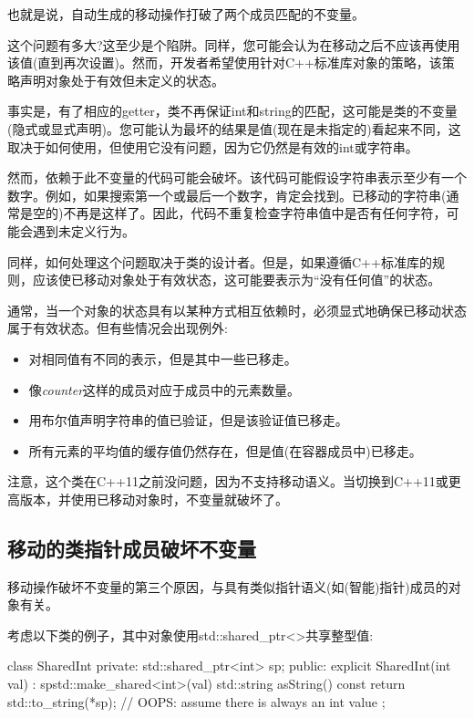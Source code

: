 也就是说，自动生成的移动操作打破了两个成员匹配的不变量。

这个问题有多大?这至少是个陷阱。同样，您可能会认为在移动之后不应该再使用该值(直到再次设置)。然而，开发者希望使用针对C++标准库对象的策略，该策略声明对象处于有效但未定义的状态。

事实是，有了相应的getter，类不再保证int和string的匹配，这可能是类的不变量(隐式或显式声明)。您可能认为最坏的结果是值(现在是未指定的)看起来不同，这取决于如何使用，但使用它没有问题，因为它仍然是有效的int或字符串。

然而，依赖于此不变量的代码可能会破坏。该代码可能假设字符串表示至少有一个数字。例如，如果搜索第一个或最后一个数字，肯定会找到。已移动的字符串(通常是空的)不再是这样了。因此，代码不重复检查字符串值中是否有任何字符，可能会遇到未定义行为。

同样，如何处理这个问题取决于类的设计者。但是，如果遵循C++标准库的规则，应该使已移动对象处于有效状态，这可能要表示为“没有任何值”的状态。

通常，当一个对象的状态具有以某种方式相互依赖时，必须显式地确保已移动状态属于有效状态。但有些情况会出现例外:

\begin{itemize}
	\item 对相同值有不同的表示，但是其中一些已移走。
	\item 像\textit{counter}这样的成员对应于成员中的元素数量。
	\item 用布尔值声明字符串的值已验证，但是该验证值已移走。
	\item 所有元素的平均值的缓存值仍然存在，但是值(在容器成员中)已移走。
\end{itemize}

注意，这个类在C++11之前没问题，因为不支持移动语义。当切换到C++11或更高版本，并使用已移动对象时，不变量就破坏了。

\subsection{移动的类指针成员破坏不变量}

移动操作破坏不变量的第三个原因，与具有类似指针语义(如(智能)指针)成员的对象有关。

考虑以下类的例子，其中对象使用std::shared_ptr<>共享整型值:

\begin{cppcode}
class SharedInt {
private:
	std::shared_ptr<int> sp;
public:
	explicit SharedInt(int val)
	: sp{std::make_shared<int>(val)} {
	}
	std::string asString() const {
		return std::to_string(*sp); // OOPS: assume there is always an int value
	}
};
\end{cppcode}


